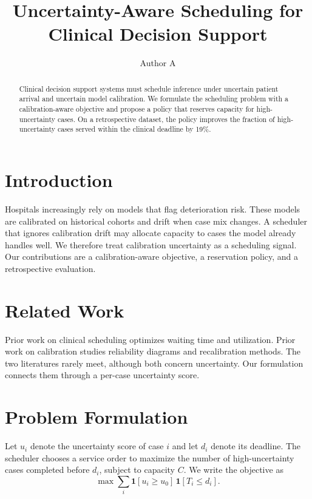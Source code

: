 \documentclass[conference]{IEEEtran}
\title{Uncertainty-Aware Scheduling for Clinical Decision Support}
\author{Author A}
\begin{document}
\maketitle

\begin{abstract}
Clinical decision support systems must schedule inference under uncertain patient arrival and uncertain model calibration.
We formulate the scheduling problem with a calibration-aware objective and propose a policy that reserves capacity for high-uncertainty cases.
On a retrospective dataset, the policy improves the fraction of high-uncertainty cases served within the clinical deadline by 19\%.
\end{abstract}

\section{Introduction}
\label{sec:intro}
Hospitals increasingly rely on models that flag deterioration risk.
These models are calibrated on historical cohorts and drift when case mix changes.
A scheduler that ignores calibration drift may allocate capacity to cases the model already handles well.
We therefore treat calibration uncertainty as a scheduling signal.
Our contributions are a calibration-aware objective, a reservation policy, and a retrospective evaluation.

\section{Related Work}
\label{sec:related}
Prior work on clinical scheduling optimizes waiting time and utilization.
Prior work on calibration studies reliability diagrams and recalibration methods.
The two literatures rarely meet, although both concern uncertainty.
Our formulation connects them through a per-case uncertainty score.

\section{Problem Formulation}
\label{sec:problem}
Let $u_i$ denote the uncertainty score of case $i$ and let $d_i$ denote its deadline.
The scheduler chooses a service order to maximize the number of high-uncertainty cases completed before $d_i$, subject to capacity $C$.
We write the objective as
\begin{equation}
\label{eq:clinical}
\max \sum_i \mathbf{1}[u_i \ge u_0] \, \mathbf{1}[T_i \le d_i].
\end{equation}
\end{document}
